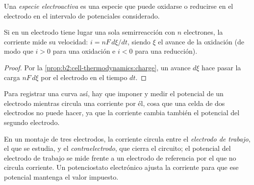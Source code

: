 \begin{definition}\label{def:b2:current-potential-curves:electroactive}
Una \emph{especie electroactiva} es una especie
que puede oxidarse o reducirse en el electrodo en el intervalo de potenciales
considerado.
\end{definition}

\begin{proposition}\label{prop:b2:current-potential-curves:current-rate}
Si en un electrodo tiene lugar una sola semirreacción con $n$ electrones, la
corriente mide su velocidad: $i = nF\,d\xi/dt$, siendo $\xi$ el avance de
la oxidación (de modo que $i > 0$ para una oxidación e $i < 0$ para una reducción).
\end{proposition}

\begin{proof}
Por la \cref{prop:b2:cell-thermodynamics:charge}, un avance $d\xi$ hace pasar la
carga $nF\,d\xi$ por el electrodo en el tiempo $dt$.
\end{proof}

Para registrar una curva así, hay que imponer y medir el potencial de un electrodo
mientras circula una corriente por él, cosa que una celda de dos electrodos
no puede hacer, ya que la corriente cambia también el potencial del segundo
electrodo.

\begin{definition}\label{def:b2:current-potential-curves:set-up}
En un montaje de tres electrodos, la corriente circula entre el \emph{electrodo
de trabajo}, el que se estudia, y el \emph{contraelectrodo},
que cierra el circuito; el potencial
del electrodo de trabajo se mide frente a un electrodo de referencia por el que
no circula corriente. Un potenciostato electrónico ajusta la corriente para
que ese potencial mantenga el valor impuesto.
\end{definition}

